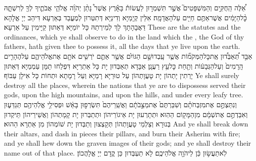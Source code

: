 \newperek
{}%
{אֵ֠לֶּה הַֽחֻקִּ֣ים וְהַמִּשְׁפָּטִים֮ אֲשֶׁ֣ר תִּשְׁמְר֣וּן לַעֲשׂוֹת֒ בָּאָ֕רֶץ אֲשֶׁר֩ נָתַ֨ן יְהֹוָ֜ה אֱלֹהֵ֧י אֲבֹתֶ֛יךָ לְךָ֖ לְרִשְׁתָּ֑הּ כׇּ֨ל\maqqaf הַיָּמִ֔ים אֲשֶׁר\maqqaf אַתֶּ֥ם חַיִּ֖ים עַל\maqqaf הָאֲדָמָֽה׃}
{אִלֵּין קְיָמַיָּא וְדִינַיָּא דְּתִטְּרוּן לְמֶעֱבַד בְּאַרְעָא דִּיהַב יְיָ אֱלָהָא דַּאֲבָהָתָךְ לָךְ לְמֵירְתַהּ כָּל יוֹמַיָּא דְּאַתּוּן קַיָּימִין עַל אַרְעָא׃}
{These are the statutes and the ordinances, which ye shall observe to do in the land which the \lord, the God of thy fathers, hath given thee to possess it, all the days that ye live upon the earth.}{}
{אַבֵּ֣ד תְּ֠אַבְּד֠וּן אֶֽת\maqqaf כׇּל\maqqaf הַמְּקֹמ֞וֹת אֲשֶׁ֧ר עָֽבְדוּ\maqqaf שָׁ֣ם הַגּוֹיִ֗ם אֲשֶׁ֥ר אַתֶּ֛ם יֹרְשִׁ֥ים אֹתָ֖ם אֶת\maqqaf אֱלֹהֵיהֶ֑ם עַל\maqqaf הֶהָרִ֤ים הָֽרָמִים֙ וְעַל\maqqaf הַגְּבָע֔וֹת וְתַ֖חַת כׇּל\maqqaf עֵ֥ץ רַעֲנָֽן׃}
{אַבָּדָא תְאַבְּדוּן יָת כָּל אַתְרַיָּא דִּפְלַחוּ תַמָּן עַמְמַיָּא דְּאַתּוּן יָרְתִין יָתְהוֹן יָת טָעֲוָתְהוֹן עַל טוּרַיָּא רָמַיָּא וְעַל רָמָתָא וּתְחוֹת כָּל אִילָן עַבּוֹף׃}
{Ye shall surely destroy all the places, wherein the nations that ye are to dispossess served their gods, upon the high mountains, and upon the hills, and under every leafy tree.}{}
{וְנִתַּצְתֶּ֣ם אֶת\maqqaf מִזְבְּחֹתָ֗ם וְשִׁבַּרְתֶּם֙ אֶת\maqqaf מַצֵּ֣בֹתָ֔ם וַאֲשֵֽׁרֵיהֶם֙ תִּשְׂרְפ֣וּן בָּאֵ֔שׁ וּפְסִילֵ֥י אֱלֹֽהֵיהֶ֖ם תְּגַדֵּע֑וּן וְאִבַּדְתֶּ֣ם אֶת\maqqaf שְׁמָ֔ם מִן\maqqaf הַמָּק֖וֹם הַהֽוּא׃}
{וּתְתָרְעוּן יָת אֵיגוֹרֵיהוֹן וּתְתַבְּרוּן יָת קָמָתְהוֹן וַאֲשֵׁירֵיהוֹן תֵּיקְדוּן בְּנוּרָא וְצַלְמֵי טָעֲוָתְהוֹן תְּקָצְצוּן וְתַבְּדוּן יָת שׁוֹמְהוֹן מִן אַתְרָא הַהוּא׃}
{And ye shall break down their altars, and dash in pieces their pillars, and burn their Asherim with fire; and ye shall hew down the graven images of their gods; and ye shall destroy their name out of that place.}{}
{לֹֽא\maqqaf תַעֲשׂ֣וּן כֵּ֔ן לַיהֹוָ֖ה אֱלֹהֵיכֶֽם׃}
{לָא תַעְבְּדוּן כֵּן קֳדָם יְיָ אֱלָהֲכוֹן׃}
